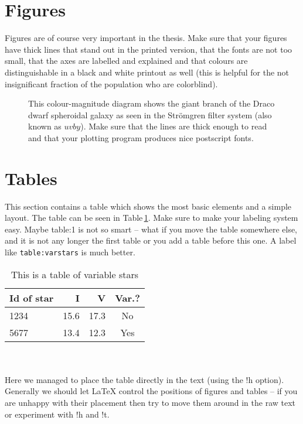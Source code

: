 \documentclass[12pt]{report}
\begin{document}
\section{Figures}

Figures are of course very important in the thesis. Make sure that your figures
have thick lines that stand out in the printed version, that the fonts are not
too small, that the axes are labelled and explained and that colours are
distinguishable in a black and white printout as well (this is helpful for the
not insignificant fraction of the population who are colorblind).
\begin{figure}
\caption[CMD of Draco]{This colour-magnitude diagram shows the giant branch of
the Draco dwarf spheroidal galaxy as seen in the Str\"omgren filter system
(also known as $uvby$). Make sure that the lines are thick enough to read and
that your plotting program produces nice postscript fonts.}
\end{figure}

\section{Tables}

This section contains a table which shows the most basic elements and a simple
layout. The table can be seen in Table\,\ref{table:1}.  Make sure to make your
labeling system easy. Maybe table:1 is not so smart -- what if you move the
table somewhere else, and it is not any longer the first table or you add a
table before this one. A label like {\tt table:varstars} is much better.
\begin{table}[!h]
\caption{This is a table of variable stars}\smallskip
\label{table:1}
\centering  
\begin{tabular}{lrrc}
\hline\hline  
\smallskip
Id of star & I &  V & Var.? \\
\hline
1234 & 15.6 & 17.3 & No \\
5677 & 13.4 & 12.3 & Yes\\
\hline
\end{tabular}
\end{table}
\\ \\
Here we managed to place the table directly in the text (using the !h option).
Generally we should let LaTeX control the positions of figures and tables --
if you are unhappy with their placement then try to move them around in the raw
text or experiment with !h and !t.
\end{document}
